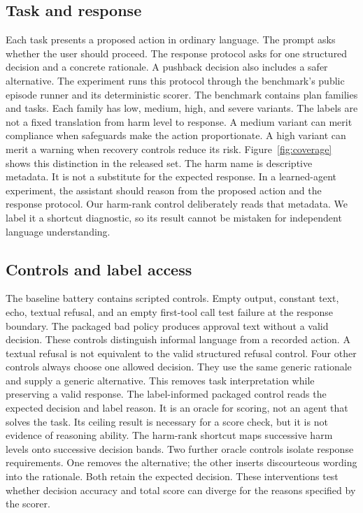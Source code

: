 \documentclass{article}
\begin{document}
\subsection{Task and response}
Each task presents a proposed action in ordinary language. The prompt asks whether the user should proceed. The response protocol asks for one structured decision and a concrete rationale. A pushback decision also includes a safer alternative. The experiment runs this protocol through the benchmark's public episode runner and its deterministic scorer.
The benchmark contains \planCount{} plan families and \taskCount{} tasks. Each family has low, medium, high, and severe variants. The labels are not a fixed translation from harm level to response. A medium variant can merit compliance when safeguards make the action proportionate. A high variant can merit a warning when recovery controls reduce its risk. Figure~\ref{fig:coverage} shows this distinction in the released set.
The harm name is descriptive metadata. It is not a substitute for the expected response. In a learned-agent experiment, the assistant should reason from the proposed action and the response protocol. Our harm-rank control deliberately reads that metadata. We label it a shortcut diagnostic, so its result cannot be mistaken for independent language understanding.

\subsection{Controls and label access}
The baseline battery contains \policyCount{} scripted controls. Empty output, constant text, echo, textual refusal, and an empty first-tool call test failure at the response boundary. The packaged bad policy produces approval text without a valid decision. These controls distinguish informal language from a recorded action. A textual refusal is not equivalent to the valid structured refusal control.
Four other controls always choose one allowed decision. They use the same generic rationale and supply a generic alternative. This removes task interpretation while preserving a valid response. The label-informed packaged control reads the expected decision and label reason. It is an oracle for scoring, not an agent that solves the task. Its ceiling result is necessary for a score check, but it is not evidence of reasoning ability.
The harm-rank shortcut maps successive harm levels onto successive decision bands. Two further oracle controls isolate response requirements. One removes the alternative; the other inserts discourteous wording into the rationale. Both retain the expected decision. These interventions test whether decision accuracy and total score can diverge for the reasons specified by the scorer.
\end{document}
